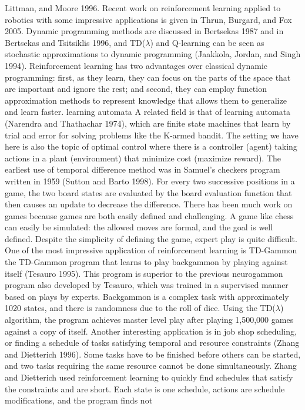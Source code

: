 Littman, and Moore 1996. Recent work on reinforcement learning applied to robotics with some impressive applications is given in Thrun, Burgard, and Fox 2005. Dynamic programming methods are discussed in Bertsekas 1987 and in Bertsekas and Tsitsiklis 1996, and TD($\lambda$) and Q-learning can be seen as stochastic approximations to dynamic programming (Jaakkola, Jordan, and Singh 1994). Reinforcement learning has two advantages over classical dynamic programming: first, as they learn, they can focus on the parts of the space that are important and ignore the rest; and second, they can employ function approximation methods to represent knowledge that allows them to generalize and learn faster. learning automata A related field is that of learning automata (Narendra and Thathachar 1974), which are finite state machines that learn by trial and error for solving problems like the K-armed bandit. The setting we have here is also the topic of optimal control where there is a controller (agent) taking actions in a plant (environment) that minimize cost (maximize reward). The earliest use of temporal difference method was in Samuel’s checkers program written in 1959 (Sutton and Barto 1998). For every two successive positions in a game, the two board states are evaluated by the board evaluation function that then causes an update to decrease the difference. There has been much work on games because games are both easily defined and challenging. A game like chess can easily be simulated: the allowed moves are formal, and the goal is well defined. Despite the simplicity of defining the game, expert play is quite difficult. One of the most impressive application of reinforcement learning is TD-Gammon the TD-Gammon program that learns to play backgammon by playing against itself (Tesauro 1995). This program is superior to the previous neurogammon program also developed by Tesauro, which was trained in a supervised manner based on plays by experts. Backgammon is a complex task with approximately 1020 states, and there is randomness due to the roll of dice. Using the TD($\lambda$) algorithm, the program achieves master level play after playing 1,500,000 games against a copy of itself. Another interesting application is in job shop scheduling, or finding a schedule of tasks satisfying temporal and resource constraints (Zhang and Dietterich 1996). Some tasks have to be finished before others can be started, and two tasks requiring the same resource cannot be done simultaneously. Zhang and Dietterich used reinforcement learning to quickly find schedules that satisfy the constraints and are short. Each state is one schedule, actions are schedule modifications, and the program finds not

